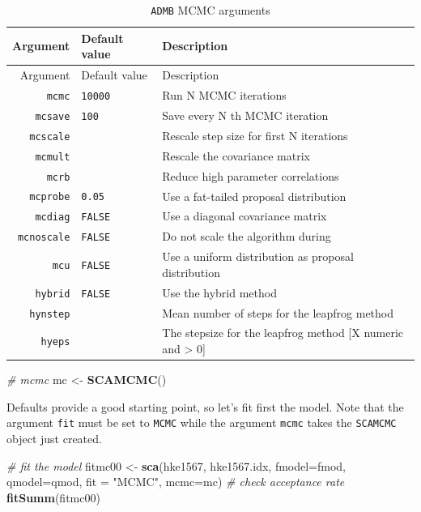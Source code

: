 \documentclass[
]{book}
\newenvironment{Shaded}{\begin{snugshade}}{\end{snugshade}}
\newcommand{\AttributeTok}[1]{\textcolor[rgb]{0.13,0.29,0.53}{#1}}
\newcommand{\CommentTok}[1]{\textcolor[rgb]{0.56,0.35,0.01}{\textit{#1}}}
\newcommand{\FunctionTok}[1]{\textcolor[rgb]{0.13,0.29,0.53}{\textbf{#1}}}
\newcommand{\NormalTok}[1]{#1}
\newcommand{\OtherTok}[1]{\textcolor[rgb]{0.56,0.35,0.01}{#1}}
\newcommand{\StringTok}[1]{\textcolor[rgb]{0.31,0.60,0.02}{#1}}
\begin{document}
\begin{longtable}[]{@{}rll@{}}
\caption{\label{tab:mcargs} \texttt{ADMB} MCMC arguments}\tabularnewline
\toprule\noalign{}
Argument & Default value & Description \\
\midrule\noalign{}
\endfirsthead
\toprule\noalign{}
Argument & Default value & Description \\
\midrule\noalign{}
\endhead
\bottomrule\noalign{}
\endlastfoot
\texttt{mcmc} & \texttt{10000} & Run N MCMC iterations \\
\texttt{mcsave} & \texttt{100} & Save every N th MCMC iteration \\
\texttt{mcscale} & & Rescale step size for first N iterations \\
\texttt{mcmult} & & Rescale the covariance matrix \\
\texttt{mcrb} & & Reduce high parameter correlations \\
\texttt{mcprobe} & \texttt{0.05} & Use a fat-tailed proposal distribution \\
\texttt{mcdiag} & \texttt{FALSE} & Use a diagonal covariance matrix \\
\texttt{mcnoscale} & \texttt{FALSE} & Do not scale the algorithm during \\
\texttt{mcu} & \texttt{FALSE} & Use a uniform distribution as proposal distribution \\
\texttt{hybrid} & \texttt{FALSE} & Use the hybrid method \\
\texttt{hynstep} & & Mean number of steps for the leapfrog method \\
\texttt{hyeps} & & The stepsize for the leapfrog method {[}X numeric and \textgreater{} 0{]} \\
\end{longtable}

\begin{Shaded}
\begin{Highlighting}[]
\CommentTok{\# mcmc}
\NormalTok{mc }\OtherTok{\textless{}{-}} \FunctionTok{SCAMCMC}\NormalTok{()}
\end{Highlighting}
\end{Shaded}

Defaults provide a good starting point, so let's fit first the model. Note that the argument \texttt{fit} must be set to \texttt{MCMC} while the argument \texttt{mcmc} takes the \texttt{SCAMCMC} object just created.

\begin{Shaded}
\begin{Highlighting}[]
\CommentTok{\# fit the model}
\NormalTok{fitmc00 }\OtherTok{\textless{}{-}} \FunctionTok{sca}\NormalTok{(hke1567, hke1567.idx, }\AttributeTok{fmodel=}\NormalTok{fmod, }\AttributeTok{qmodel=}\NormalTok{qmod, }\AttributeTok{fit =} \StringTok{"MCMC"}\NormalTok{, }\AttributeTok{mcmc=}\NormalTok{mc)}
\CommentTok{\# check acceptance rate}
\FunctionTok{fitSumm}\NormalTok{(fitmc00)}
\end{Highlighting}
\end{Shaded}
\end{document}
